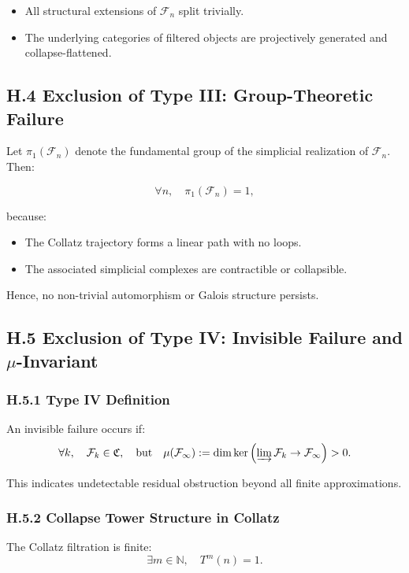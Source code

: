 \documentclass[11pt]{article}
\begin{document}
\begin{itemize}
  \item All structural extensions of \( \mathcal{F}_n \) split trivially.
  \item The underlying categories of filtered objects are projectively generated and collapse-flattened.
\end{itemize}

\subsection*{H.4 Exclusion of Type III: Group-Theoretic Failure}

Let \( \pi_1(\mathcal{F}_n) \) denote the fundamental group of the simplicial realization of \( \mathcal{F}_n \). Then:

\[
\forall n,\quad \pi_1(\mathcal{F}_n) = 1,
\]

because:
\begin{itemize}
  \item The Collatz trajectory forms a linear path with no loops.
  \item The associated simplicial complexes are contractible or collapsible.
\end{itemize}

Hence, no non-trivial automorphism or Galois structure persists.

\subsection*{H.5 Exclusion of Type IV: Invisible Failure and \texorpdfstring{\( \mu \)}{μ}-Invariant}

\subsubsection*{H.5.1 Type IV Definition}

An invisible failure occurs if:
\[
\forall k,\quad \mathcal{F}_k \in \mathfrak{C}, \quad \text{but} \quad \mu(\mathcal{F}_\infty) := \dim \ker\left( \varinjlim \mathcal{F}_k \to \mathcal{F}_\infty \right) > 0.
\]

This indicates undetectable residual obstruction beyond all finite approximations.

\subsubsection*{H.5.2 Collapse Tower Structure in Collatz}

The Collatz filtration is finite:
\[
\exists m \in \mathbb{N},\quad T^m(n) = 1.
\]
\end{document}
